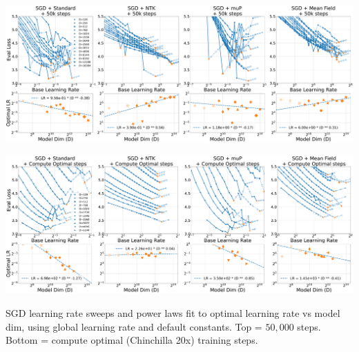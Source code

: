 \documentclass{article}
\theoremstyle{plain}
\theoremstyle{definition}
\theoremstyle{remark}
\begin{document}
\clearpage
\thispagestyle{plain}
\begin{SidewaysFigure}
\\
\includegraphics[width=0.98\linewidth]{icml2024/figures/lr_sweeps/compute_opt_appendix/sgd+50k_steps.pdf}

\figvspace

\includegraphics[width=0.98\linewidth]{icml2024/figures/lr_sweeps/compute_opt_appendix/sgd+compute_opt.pdf}
\caption{SGD learning rate sweeps and power laws fit to optimal learning rate vs model dim, using global learning rate and default constants. Top = $50{,}000$ steps. Bottom = compute optimal (Chinchilla 20x) training steps.}
\label{fig:app_compute_opt_sgd}
\end{SidewaysFigure}
\clearpage
\end{document}
